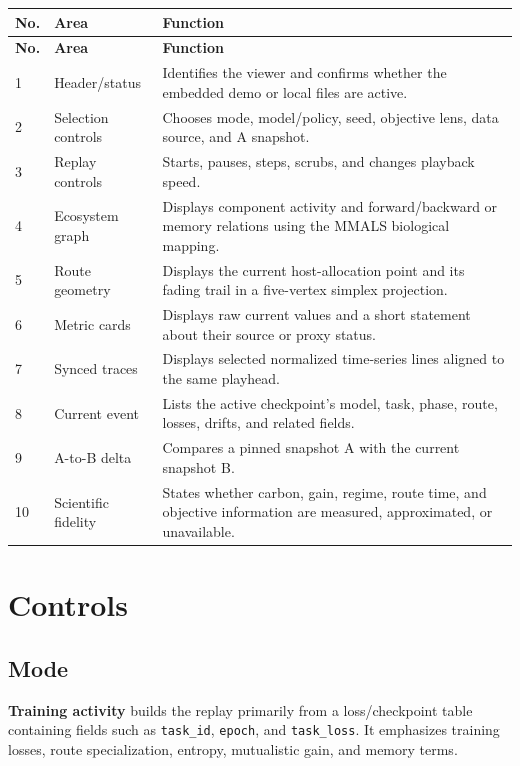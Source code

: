\documentclass[11pt,a4paper]{article}
\newcommand{\ui}[1]{\textsf{\bfseries #1}}
\newcommand{\code}[1]{\texttt{#1}}
\begin{document}
\clearpage
\begin{longtable}{@{}P{12mm}P{45mm}P{96mm}@{}}
\toprule
\textbf{No.} & \textbf{Area} & \textbf{Function}\\
\midrule
\endfirsthead
\toprule
\textbf{No.} & \textbf{Area} & \textbf{Function}\\
\midrule
{} & Header/status & Identifies the viewer and confirms whether the embedded demo or local files are active.\\
2 & Selection controls & Chooses mode, model/policy, seed, objective lens, data source, and A snapshot.\\
3 & Replay controls & Starts, pauses, steps, scrubs, and changes playback speed.\\
4 & Ecosystem graph & Displays component activity and forward/backward or memory relations using the MMALS biological mapping.\\
5 & Route geometry & Displays the current host-allocation point and its fading trail in a five-vertex simplex projection.\\
6 & Metric cards & Displays raw current values and a short statement about their source or proxy status.\\
7 & Synced traces & Displays selected normalized time-series lines aligned to the same playhead.\\
8 & Current event & Lists the active checkpoint's model, task, phase, route, losses, drifts, and related fields.\\
9 & A-to-B delta & Compares a pinned snapshot A with the current snapshot B.\\
10 & Scientific fidelity & States whether carbon, gain, regime, route time, and objective information are measured, approximated, or unavailable.\\
\bottomrule
\end{longtable}

\section{Controls}

\subsection{Mode}

\ui{Training activity} builds the replay primarily from a loss/checkpoint table containing fields such as \code{task\_id}, \code{epoch}, and \code{task\_loss}. It emphasizes training losses, route specialization, entropy, mutualistic gain, and memory terms.
\end{document}
